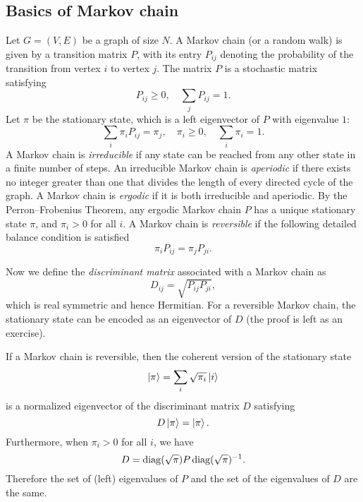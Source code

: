 \subsection{Basics of Markov chain}

Let $G=(V,E)$ be a graph of size $N$. A Markov chain (or a random walk) is given by a transition matrix $P$, with its entry $P_{ij}$ denoting the probability of the transition from vertex $i$ to vertex $j$. 
The matrix $P$ is a stochastic matrix satisfying
\begin{equation}
P_{ij}\ge 0, \quad \sum_{j} P_{ij}=1.
\end{equation}
Let $\pi$ be the stationary state, which is a left eigenvector of $P$ with  eigenvalue $1$:
\begin{equation}
\sum_i\pi_i P_{ij}=\pi_j, \quad \pi_i\ge 0, \quad \sum_{i}\pi_i =1.
\end{equation}
A Markov chain is \emph{irreducible} if any state can be reached from any other state in a finite number of steps. An irreducible Markov chain is \emph{aperiodic} if there exists no
integer greater than one that divides the length of every directed cycle of the graph. A Markov chain is \emph{ergodic} if it is both irreducible and aperiodic. By the Perron--Frobenius Theorem, any ergodic Markov chain $P$ has a unique stationary state $\pi$, and $\pi_i>0$ for all $i$. A Markov chain is \emph{reversible} if the following detailed balance condition is satisfied
\begin{equation}
\pi_i P_{ij}=\pi_j P_{ji}.
\end{equation}

Now we define the \emph{discriminant matrix} associated with a Markov chain as
\begin{equation}
\label{eqn:discriminant_matrix}
D_{ij}=\sqrt{P_{ij}P_{ji}},
\end{equation}
which is real symmetric and hence Hermitian. For a reversible Markov chain, the stationary state can be encoded as an eigenvector of $D$ (the proof is left as an exercise).
\begin{prop}
If a Markov chain is reversible, then the coherent version of the stationary state
\begin{equation}
\ket{\pi}=\sum_{i}\sqrt{\pi_i}\ket{i}
\end{equation}
is a normalized eigenvector of the discriminant matrix $D$ satisfying
\begin{equation}
D\ket{\pi}=\ket{\pi}.
\end{equation}
Furthermore, when $\pi_i>0$ for all $i$, we have
\begin{equation}
D=\operatorname{diag}(\sqrt{\pi}) P \operatorname{diag}(\sqrt{\pi})^{-1}.
\end{equation}
Therefore the set of (left) eigenvalues of $P$ and the set of the eigenvalues of $D$ are the same.
\label{prop:discriminant_reversiblewalk}
\end{prop}

